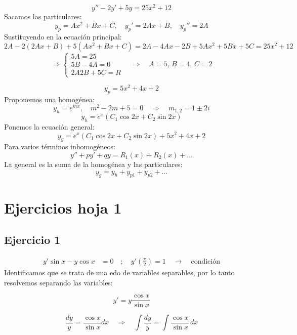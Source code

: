 \documentclass[a4paper,12pt]{article}
\begin{document}
\[
y'' - 2y' + 5y = 25x^2 + 12
\]
Sacamos las particulares:
\[
y_p = Ax^2 + Bx + C, \quad
y_p' = 2Ax + B, \quad
y_p'' = 2A
\]
Sustituyendo en la ecuación principal:
{\small
\[
2A - 2(2Ax + B) + 5(Ax^2 + Bx + C)
= 2A - 4Ax - 2B + 5Ax^2 + 5Bx + 5C
= 25x^2 + 12
\]
}
\vspace{-0,6 em}
\[
\Rightarrow 
\begin{cases}
5A = 25 \\
5B - 4A = 0 \\
2A 2B + 5C = R
\end{cases}
\quad \Rightarrow \quad
A = 5, \, B = 4, \, C = 2
\]

\[
y_p = 5x^2 + 4x + 2
\]
Proponemos una homogénea:
\[
y_h = e^{mx}, \quad m^2 - 2m + 5 = 0 
\quad \Rightarrow \quad 
m_{1,2} = 1 \pm 2i
\]
\[
y_h = e^x (C_1 \cos 2x + C_2 \sin 2x)
\]
Ponemos la ecuación general:
\[
y_g = e^x (C_1 \cos 2x + C_2 \sin 2x) + 5x^2 + 4x + 2
\]
Para varios términos inhomogéneos:
\[
y'' + p y' + q y = R_1(x) + R_2(x) + \dots
\]
La general es la suma de la homogénea y las particulares:
\[
y_g = y_h + y_{p1} + y_{p2} + \dots
\]























\newpage
\section{Ejercicios hoja 1}

\subsection{Ejercicio 1}
\vspace{-1.2em}
\[
\begin{aligned}
y' \sin x - y \cos x &= 0 
\quad ;\quad 
y'\!\left( \frac{\pi}{2} \right) = 1 \quad \rightarrow \quad \text{condición}
\end{aligned}
\]
Identificamos que se trata de una edo de variables separables, por lo tanto resolvemos 
separando las variables:

\[
y' = y \frac{\cos x}{\sin x}
\]

\[
\frac{dy}{y} = \frac{\cos x}{\sin x}dx
\quad \Rightarrow \quad
\int \frac{dy}{y} = \int \frac{\cos x}{\sin x}\, dx
\]
\end{document}
